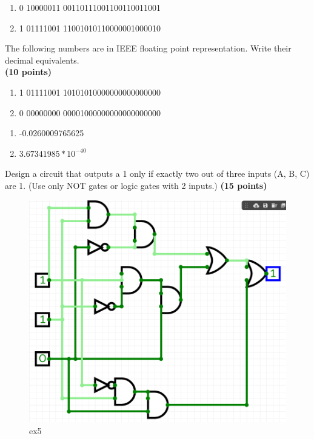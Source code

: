 \documentclass[10pt,answers]{exam}
\newcommand{\qpoints}[1]{\hfill \textbf{(#1 points)}}
\begin{document}
\begin{questions}
\begin{solution}
	\begin{enumerate}[label=\alph*)]
		\item 0 10000011 00110111001100110011001
		\item 1 01111001 11001010110000001000010
	\end{enumerate}
\end{solution}


\question The following numbers are in IEEE floating point representation. Write their decimal equivalents. \\ \qpoints{10}
\begin{enumerate}[label=\alph*)]
    \item 1 01111001 10101010000000000000000 
    \item 0 00000000 00001000000000000000000
\end{enumerate}


\begin{solution}
	\begin{enumerate}[label=\alph*)]
		\item -0.0260009765625
		\item $3.67341985 * 10^{-40}$
	\end{enumerate}
\end{solution}

\question Design a circuit that outputs a 1 only if exactly two out of three inputs (A, B, C) are 1. (Use only NOT gates or logic gates with 2 inputs.) \qpoints{15}

\begin{solution}
	\begin{figure}[H]
		\centering
		\includegraphics[width=\textwidth]{ex5.png}
		\caption{ex5}
    	\label{fig:ex5}
	\end{figure}
\end{solution}



\end{questions}
\end{document}
